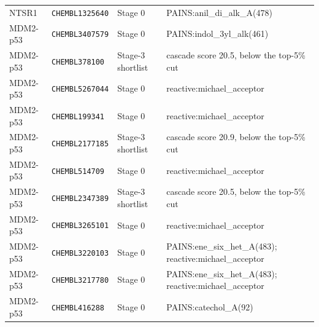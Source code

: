 {\begin{longtable}{@{}llp{}p{}@{}}
NTSR1 & \texttt{CHEMBL1325640} & Stage 0 & PAINS:anil\_di\_alk\_A(478) \\
MDM2-p53 & \texttt{CHEMBL3407579} & Stage 0 & PAINS:indol\_3yl\_alk(461) \\
MDM2-p53 & \texttt{CHEMBL378100} & Stage-3 shortlist & cascade score 20.5, below the top-5\% cut \\
MDM2-p53 & \texttt{CHEMBL5267044} & Stage 0 & reactive:michael\_acceptor \\
MDM2-p53 & \texttt{CHEMBL199341} & Stage 0 & reactive:michael\_acceptor \\
MDM2-p53 & \texttt{CHEMBL2177185} & Stage-3 shortlist & cascade score 20.9, below the top-5\% cut \\
MDM2-p53 & \texttt{CHEMBL514709} & Stage 0 & reactive:michael\_acceptor \\
MDM2-p53 & \texttt{CHEMBL2347389} & Stage-3 shortlist & cascade score 20.5, below the top-5\% cut \\
MDM2-p53 & \texttt{CHEMBL3265101} & Stage 0 & reactive:michael\_acceptor \\
MDM2-p53 & \texttt{CHEMBL3220103} & Stage 0 & PAINS:ene\_six\_het\_A(483); reactive:michael\_acceptor \\
MDM2-p53 & \texttt{CHEMBL3217780} & Stage 0 & PAINS:ene\_six\_het\_A(483); reactive:michael\_acceptor \\
MDM2-p53 & \texttt{CHEMBL416288} & Stage 0 & PAINS:catechol\_A(92) \\
\hline
\end{longtable}
}
